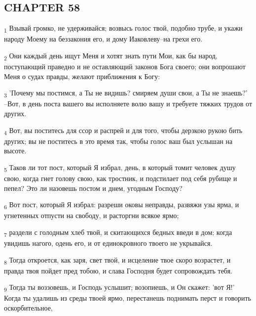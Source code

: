 \subsection{CHAPTER 58}
\begin{tcolorbox}
\textsubscript{1} Взывай громко, не удерживайся; возвысь голос твой, подобно трубе, и укажи народу Моему на беззакония его, и дому Иаковлеву--на грехи его.
\end{tcolorbox}
\begin{tcolorbox}
\textsubscript{2} Они каждый день ищут Меня и хотят знать пути Мои, как бы народ, поступающий праведно и не оставляющий законов Бога своего; они вопрошают Меня о судах правды, желают приближения к Богу:
\end{tcolorbox}
\begin{tcolorbox}
\textsubscript{3} 'Почему мы постимся, а Ты не видишь? смиряем души свои, а Ты не знаешь?' --Вот, в день поста вашего вы исполняете волю вашу и требуете тяжких трудов от других.
\end{tcolorbox}
\begin{tcolorbox}
\textsubscript{4} Вот, вы поститесь для ссор и распрей и для того, чтобы дерзкою рукою бить других; вы не поститесь в это время так, чтобы голос ваш был услышан на высоте.
\end{tcolorbox}
\begin{tcolorbox}
\textsubscript{5} Таков ли тот пост, который Я избрал, день, в который томит человек душу свою, когда гнет голову свою, как тростник, и подстилает под себя рубище и пепел? Это ли назовешь постом и днем, угодным Господу?
\end{tcolorbox}
\begin{tcolorbox}
\textsubscript{6} Вот пост, который Я избрал: разреши оковы неправды, развяжи узы ярма, и угнетенных отпусти на свободу, и расторгни всякое ярмо;
\end{tcolorbox}
\begin{tcolorbox}
\textsubscript{7} раздели с голодным хлеб твой, и скитающихся бедных введи в дом; когда увидишь нагого, одень его, и от единокровного твоего не укрывайся.
\end{tcolorbox}
\begin{tcolorbox}
\textsubscript{8} Тогда откроется, как заря, свет твой, и исцеление твое скоро возрастет, и правда твоя пойдет пред тобою, и слава Господня будет сопровождать тебя.
\end{tcolorbox}
\begin{tcolorbox}
\textsubscript{9} Тогда ты воззовешь, и Господь услышит; возопиешь, и Он скажет: 'вот Я!' Когда ты удалишь из среды твоей ярмо, перестанешь поднимать перст и говорить оскорбительное,
\end{tcolorbox}
